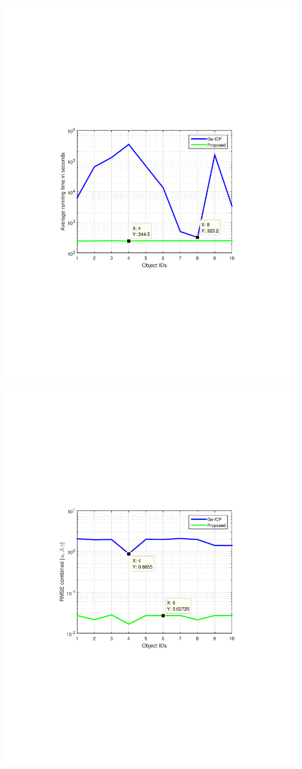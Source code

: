 \documentclass{UCF_ETD}
\begin{document}
\begin{figure}[h] 
\begin{center}
\includegraphics[scale=0.6]{RobustRegistration/GoICPvsOursSpeed}
\includegraphics[scale=0.6]{RobustRegistration/GoICPvsOursAccuracy}

\end{center}
\end{figure}
\end{document}
